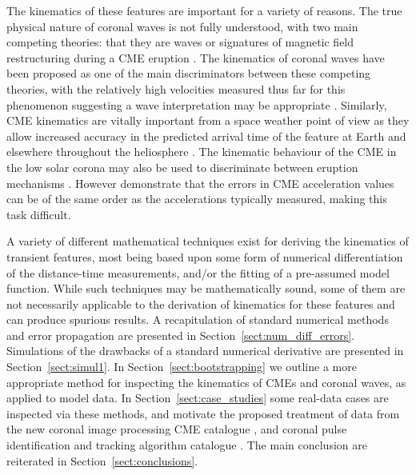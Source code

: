 \documentclass[structabstract]{aa}
\begin{document}
The kinematics of these features are important for a variety of reasons. The true physical nature of coronal waves is not fully understood, with two main competing theories: that they are waves \citep[e.g.,][]{2012ApJ...754....7S,2010ApJ...716L..57V} or signatures of magnetic field restructuring during a CME eruption \citep[e.g.,][]{2011ApJ...738..167S,2011ApJ...732L..20C}. The kinematics of coronal waves have been proposed as one of the main discriminators between these competing theories, with the relatively high velocities measured thus far for this phenomenon suggesting a wave interpretation may be appropriate \citep[cf.][]{2011A&A...532A.151W,2012ApJ...753..112Z}. Similarly, CME kinematics are vitally important from a space weather point of view as they allow increased accuracy in the predicted arrival time of the feature at Earth and elsewhere throughout the heliosphere \citep{2010NatCo...1E..74B, 2005AnGeo..23.1033S, 2004Natur.432...78P}. The kinematic behaviour of the CME in the low solar corona may also be used to discriminate between eruption mechanisms \citep{2010A&A...516A..44L}. However \citet{2007ApJ...657.1117W} demonstrate that the errors in CME acceleration values can be of the same order as the accelerations typically measured, making this task difficult.

A variety of different mathematical techniques exist for deriving the kinematics of transient features, most being based upon some form of numerical differentiation of the distance-time measurements, and/or the fitting of a pre-assumed model function. While such techniques may be mathematically sound, some of them are not necessarily applicable to the derivation of kinematics for these features and can produce spurious results. A recapitulation of standard numerical methods and error propagation are presented in Section~\ref{sect:num_diff_errors}. Simulations of the drawbacks of a standard numerical derivative are presented in Section~\ref{sect:simul1}. In Section~\ref{sect:bootstrapping} we outline a more appropriate method for inspecting the  kinematics of CMEs and coronal waves, as applied to model data. In Section~\ref{sect:case_studies} some real-data cases are inspected via these methods, and motivate the proposed treatment of data from the new coronal image processing CME catalogue \citep[CORIMP;][]{2012ApJ...752..144M, 2012ApJ...752..145B}, and coronal pulse identification and tracking algorithm catalogue \citep[CorPITA;][]{2011A&A...531A..42L}. The main conclusion are reiterated in Section~\ref{sect:conclusions}.
\end{document}
